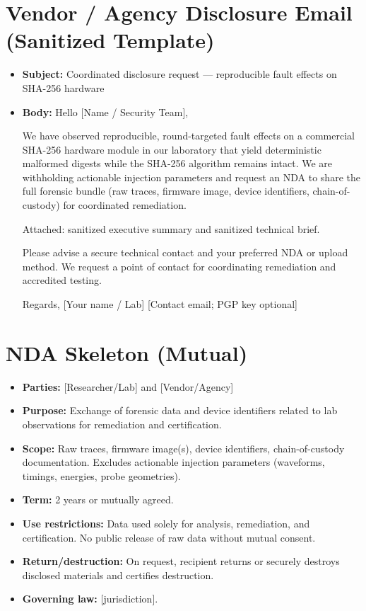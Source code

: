 \documentclass[11pt, a4paper]{article}
\begin{document}
\section{Vendor / Agency Disclosure Email (Sanitized Template)}
\begin{itemize}
    \item \textbf{Subject:} Coordinated disclosure request --- reproducible fault effects on SHA-256 hardware
    \item \textbf{Body:} Hello [Name / Security Team],
    
    We have observed reproducible, round-targeted fault effects on a commercial SHA-256 hardware module in our laboratory that yield deterministic malformed digests while the SHA-256 algorithm remains intact. We are withholding actionable injection parameters and request an NDA to share the full forensic bundle (raw traces, firmware image, device identifiers, chain-of-custody) for coordinated remediation.
    
    Attached: sanitized executive summary and sanitized technical brief.
    
    Please advise a secure technical contact and your preferred NDA or upload method. We request a point of contact for coordinating remediation and accredited testing.
    
    Regards,
    [Your name / Lab]
    [Contact email; PGP key optional]
\end{itemize}

\section{NDA Skeleton (Mutual)}
\begin{itemize}
    \item \textbf{Parties:} [Researcher/Lab] and [Vendor/Agency]
    \item \textbf{Purpose:} Exchange of forensic data and device identifiers related to lab observations for remediation and certification.
    \item \textbf{Scope:} Raw traces, firmware image(s), device identifiers, chain-of-custody documentation. Excludes actionable injection parameters (waveforms, timings, energies, probe geometries).
    \item \textbf{Term:} 2 years or mutually agreed.
    \item \textbf{Use restrictions:} Data used solely for analysis, remediation, and certification. No public release of raw data without mutual consent.
    \item \textbf{Return/destruction:} On request, recipient returns or securely destroys disclosed materials and certifies destruction.
    \item \textbf{Governing law:} [jurisdiction].
\end{itemize}
\end{document}

